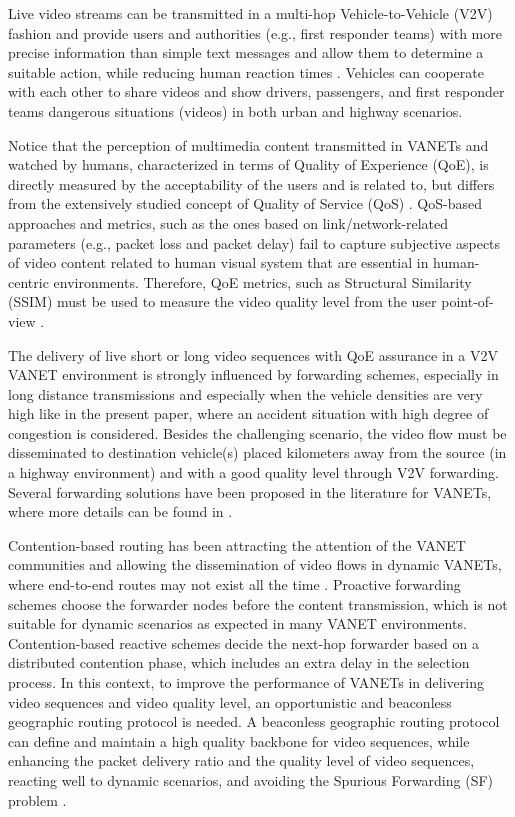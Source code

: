 \documentclass{acm_proc_article-sp}
\begin{document}
Live video streams can be transmitted in a multi-hop Vehicle-to-Vehicle (V2V) fashion and provide users and authorities (e.g., first responder teams) with more precise information than simple text messages and allow them to determine a suitable action, while reducing human reaction times \cite{Vehicularcommunications:emergency}. Vehicles can cooperate with each other to share videos and show drivers, passengers, and first responder teams dangerous situations (videos) in both urban and highway scenarios.

Notice that the perception of multimedia content transmitted in VANETs and watched by humans, characterized in terms of Quality of Experience (QoE), is directly measured by the acceptability of the users and is related to, but differs from the extensively studied concept of Quality of Service (QoS) \cite{QualityEstimator}. QoS-based approaches and metrics, such as the ones based on link/network-related parameters  (e.g., packet loss and packet delay) fail to capture subjective aspects of video content related to human visual system that are essential in human-centric environments. Therefore, QoE metrics, such as Structural Similarity (SSIM) must be used to measure the video quality level from the user point-of-view \cite{QoEMu}.

The delivery of live short or long video sequences with QoE assurance in a V2V VANET environment is strongly influenced by forwarding schemes, especially in long distance transmissions and especially when the vehicle densities are very high like in the present paper, where an accident situation with high degree of congestion is considered. Besides the challenging scenario, the video flow must be disseminated to destination vehicle(s) placed kilometers away from the source (in a highway environment) and with a good quality level through V2V forwarding. Several forwarding solutions have been proposed in the literature for VANETs, where more details can be found in \cite{VehicularAdHocGerla}.

Contention-based routing has been attracting the attention of the VANET communities and allowing the dissemination of video flows in dynamic VANETs, where end-to-end routes may not exist all the time \cite{VideoBackboneDiFelice}. Proactive forwarding schemes choose the forwarder nodes before the content transmission, which is not suitable for dynamic scenarios as expected in many VANET environments. Contention-based reactive schemes decide the next-hop forwarder based on a distributed contention phase, which includes an extra delay in the selection process. In this context, to improve the performance of VANETs in delivering video sequences and video quality level, an opportunistic and beaconless geographic routing protocol is needed. A beaconless geographic routing protocol can define and maintain a high quality backbone for video sequences, while enhancing the packet delivery ratio and the quality level of video sequences, reacting well to dynamic scenarios, and avoiding the Spurious Forwarding (SF) problem \cite{VTCDeFelice}.
\end{document}
